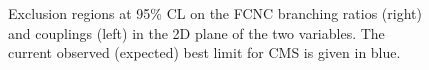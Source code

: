 \begin{figure}[ht]
	\centering
	\caption{Exclusion regions at 95\% CL on the FCNC branching ratios (right) and couplings (left) in the 2D plane of the two variables. The current observed (expected) best limit for CMS is given in blue.}
	\label{fig:exclusionlimitbrfcnconc}
\end{figure}

%
